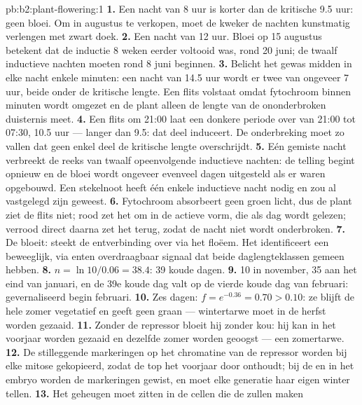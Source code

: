 \begin{solution}{pb:b2:plant-flowering:1}
\textbf{1.} Een nacht van 8 uur is korter dan de kritische 9.5 uur: geen
bloei. Om in augustus te verkopen, moet de kweker de nachten kunstmatig
verlengen met zwart doek.
\textbf{2.} Een nacht van 12 uur. Bloei op 15 augustus betekent dat de
inductie 8 weken eerder voltooid was, rond 20 juni; de twaalf inductieve
nachten moeten rond 8 juni beginnen.
\textbf{3.} Belicht het gewas midden in elke nacht enkele minuten: een nacht
van 14.5 uur wordt er twee van ongeveer 7 uur, beide onder de kritische
lengte. Een flits volstaat omdat fytochroom binnen minuten wordt omgezet en
de plant alleen de lengte van de ononderbroken duisternis meet.
\textbf{4.} Een flits om 21:00 laat een donkere periode over van
21:00 tot 07:30, 10.5 uur --- langer dan 9.5: dat deel induceert. De
onderbreking moet zo vallen dat geen enkel deel de kritische lengte
overschrijdt.
\textbf{5.} Eén gemiste nacht verbreekt de reeks van twaalf opeenvolgende
inductieve nachten: de telling begint opnieuw en de bloei wordt ongeveer
evenveel dagen uitgesteld als er waren opgebouwd. Een stekelnoot heeft één
enkele inductieve nacht nodig en zou al vastgelegd zijn geweest.
\textbf{6.} Fytochroom absorbeert geen groen licht, dus de plant ziet de
flits niet; rood zet het om in de actieve vorm, die als dag wordt gelezen;
verrood direct daarna zet het terug, zodat de nacht niet wordt onderbroken.
\textbf{7.} De  bloeit:  steekt de entverbinding over
via het floëem. Het identificeert een beweeglijk, via enten overdraagbaar
signaal dat beide daglengteklassen gemeen hebben.
\textbf{8.} $n = \ln 10/0.06 = 38.4$: 39 koude dagen.
\textbf{9.} 10 in november, 35 aan het eind van januari, en de 39e koude dag
valt op de vierde koude dag van februari: gevernaliseerd begin februari.
\textbf{10.} Zes dagen: $f = e^{-0.36} = 0.70 > 0.10$: ze blijft de hele
zomer vegetatief en geeft geen graan --- wintertarwe moet in de herfst
worden gezaaid.
\textbf{11.} Zonder de repressor bloeit hij zonder kou: hij kan in het
voorjaar worden gezaaid en dezelfde zomer worden geoogst --- een zomertarwe.
\textbf{12.} De stilleggende markeringen op het chromatine van de repressor
worden bij elke mitose gekopieerd, zodat de top het voorjaar door onthoudt;
bij de  en in het embryo worden de markeringen gewist, en moet elke
generatie haar eigen winter tellen.
\textbf{13.} Het geheugen moet zitten in de cellen die de  zullen maken

\end{solution}
